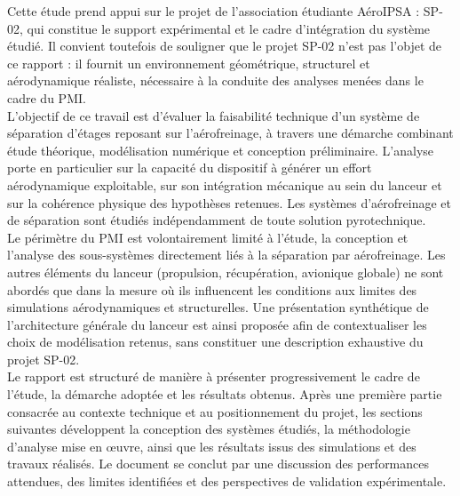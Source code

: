 \noindent Cette étude prend appui sur le projet de l'association étudiante AéroIPSA\cite{AeroIPSA} : SP-02, qui constitue le
support expérimental et le cadre d’intégration du système étudié. Il convient toutefois de souligner que le projet SP-02 n’est pas
l’objet de ce rapport : il fournit un environnement géométrique, structurel et aérodynamique réaliste, nécessaire à la conduite
des analyses menées dans le cadre du \acrshort{PMI}.\\

L’objectif de ce travail est d’évaluer la faisabilité technique d’un système de séparation d’étages reposant sur l’aérofreinage,
à travers une démarche combinant étude théorique, modélisation numérique et conception préliminaire. L’analyse porte en
particulier sur la capacité du dispositif à générer un effort aérodynamique exploitable, sur son intégration mécanique au sein
du lanceur et sur la cohérence physique des hypothèses retenues. Les systèmes d’aérofreinage et de séparation sont étudiés
indépendamment de toute solution pyrotechnique.\\

Le périmètre du \acrshort{PMI} est volontairement limité à l’étude, la conception et l’analyse des sous-systèmes directement liés
à la séparation par aérofreinage. Les autres éléments du lanceur (propulsion, récupération, avionique globale) ne sont abordés que
dans la mesure où ils influencent les conditions aux limites des simulations aérodynamiques et structurelles. Une présentation
synthétique de l’architecture générale du lanceur est ainsi proposée afin de contextualiser les choix de modélisation retenus,
sans constituer une description exhaustive du projet SP-02.\\

Le rapport est structuré de manière à présenter progressivement le cadre de l’étude, la démarche adoptée et les résultats
obtenus. Après une première partie consacrée au contexte technique et au positionnement du projet, les sections suivantes
développent la conception des systèmes étudiés, la méthodologie d’analyse mise en œuvre, ainsi que les résultats issus des
simulations et des travaux réalisés. Le document se conclut par une discussion des performances attendues, des limites
identifiées et des perspectives de validation expérimentale.


\newpage
